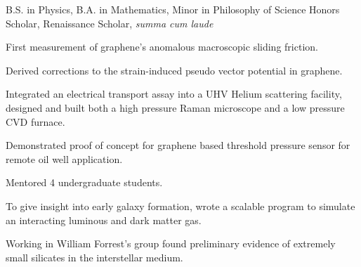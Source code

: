 {\begin{singlespace}
{	\newline
	B.S. in Physics, B.A. in Mathematics, Minor in Philosophy of Science\newline
	Honors Scholar, Renaissance Scholar, \emph{summa cum laude}\newline
}


{
	\begin{description}[noitemsep,topsep=-5pt,labelindent=15pt]
	\item[Experiment:] First measurement of graphene's anomalous macroscopic sliding friction. 
	\item[Theory:] Derived corrections to the strain-induced pseudo vector potential in graphene.
	\item[Aperatus design:] Integrated an electrical transport assay into a UHV Helium scattering facility, designed and built both a high pressure Raman microscope and a low pressure CVD furnace.
	\item[Device:] Demonstrated proof of concept for graphene based threshold pressure sensor for remote oil well application.
	\item[Mentoring:] Mentored 4 undergraduate students.
	\end{description}
	\vspace{\sspace}

	 \newline
	To give insight into early galaxy formation, wrote a scalable program to simulate an interacting luminous and dark matter gas.
	 
	 \newline
	Working in William Forrest's group found preliminary evidence of extremely small silicates in the interstellar medium.

}
\end{singlespace}}
